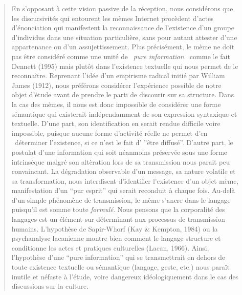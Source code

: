 \begin{quote}
En s{\textquoteright}opposant \`a cette vision passive de la r\'eception, nous consid\'erons que les discursivit\'es qui entourent les m\`emes Internet proc\`edent d{\textquoteright}actes d{\textquoteright}\'enonciation qui manifestent la reconnaissance de l{\textquoteright}existence d{\textquoteright}un groupe d{\textquoteright}individus dans une situation particuli\`ere, sans pour autant attester d{\textquoteright}une appartenance ou d{\textquoteright}un assujettissement. Plus pr\'ecis\'ement, le m\`eme ne doit pas \^etre consid\'er\'e comme une unit\'e de {\guillemotleft}~\textit{pure information~{\guillemotright}} comme le fait Dennett (1995) mais plut\^ot dans l{\textquoteright}existence textuelle qui nous permet de le reconna\^itre. Reprenant l{\textquoteright}id\'ee d{\textquoteright}un empirisme radical initi\'e par William James (1912), nous pr\'ef\'erons consid\'erer l'exp\'erience possible de notre objet d{\textquoteright}\'etude avant de prendre le parti de discourir sur sa structure. Dans la cas des m\`emes, il nous est donc impossible de consid\'erer une forme s\'emantique qui existerait ind\'ependamment de son expression syntaxique et textuelle. D{\textquoteright}une part, son identification en serait rendue difficile voire impossible, puisque aucune forme d{\textquoteright}activit\'e r\'eelle ne permet d{\textquoteright}en \ d\'eterminer l{\textquoteright}existence, si ce n{\textquoteright}est le fait d{\textquoteright} {\textquotedblright}\^etre diffus\'e{\textquotedblright}. D{\textquoteright}autre part, le postulat d{\textquoteright}une information qui soit n\'eanmoins pr\'eserv\'ee sous une forme intrins\`eque malgr\'e son alt\`eration lors de sa transmission nous parait peu convaincant. La d\'egradation observable d{\textquoteright}un message, sa nature volatile et sa transformation, nous interdisent d{\textquoteright}identifier l{\textquoteright}existence d{\textquoteright}un objet m\`eme, manifestation d{\textquoteright}un {\textquotedblleft}pur esprit{\textquotedblright} qui serait reconduit \`a chaque fois. Au-del\`a d{\textquoteright}un simple ph\'enom\`ene de transmission, le m\`eme s{\textquoteright}ancre dans le langage puisqu{\textquoteright}il est somme toute \textit{formul\'e}. Nous pensons que la corporalit\'e des langages est un \'el\'ement sur-d\'eterminant aux processus de transmission humains. L{\textquoteright}hypoth\`ese de Sapir-Whorf (Kay \& Kempton, 1984) ou la psychanalyse lacanienne montre bien comment le langage structure et conditionne les actes et pratiques culturelles (Lacan, 1966). Ainsi, l{\textquoteright}hypoth\`ese d{\textquoteright}une {\textquotedblleft}pure information{\textquotedblright} qui se transmettrait en dehors de toute existence textuelle ou s\'emantique (langage, geste, etc.) nous para\^it inutile et n\'efaste \`a l{\textquoteright}\'etude, voire dangereux id\'eologiquement dans le cas des discussions sur la culture.  

\end{quote}
